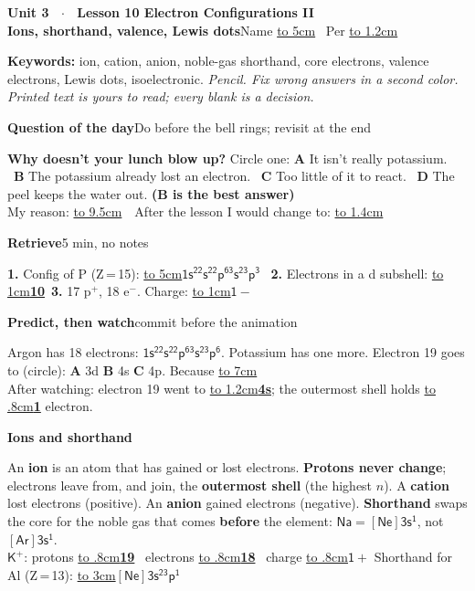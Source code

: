 \documentclass[12pt,letterpaper]{article}
\newif\ifkey \ifdefined\KEY\keytrue\fi
\newcommand{\cf}[1]{\ensuremath{\mathsf{#1}}}
\newcommand{\A}[1]{\ifkey\textcolor{key}{\textbf{#1}}\fi}
\newcommand{\bl}[2]{\underline{\hbox to #1{\hfil\A{#2}\hfil}}}
\newcommand{\sbar}[2][]{\vspace{3pt}\colorbox{gray!22}{\parbox{\dimexpr\linewidth-2\fboxsep}{\small\textbf{#2}\hfill{\footnotesize #1}}}\par\vspace{1pt}}
\newcommand{\dash}{\begin{tcolorbox}[enhanced,colback=white,colframe=black,boxrule=0.6pt,left=4pt,right=4pt,top=2pt,bottom=2pt,arc=0pt,borderline={0.6pt}{0pt}{white,dash pattern=on 4pt off 3pt}]}
\newcommand{\edash}{\end{tcolorbox}}
\begin{document}
\raggedright
\colorbox{gray!30}{\parbox{\dimexpr\linewidth-2\fboxsep}{\Large\textbf{Unit 3 \ $\cdot$ \ Lesson 10 \quad Electron Configurations II}\\[1pt]\normalsize\textbf{Ions, shorthand, valence, Lewis dots}\hfill Name \bl{5cm}{} \ Per \bl{1.2cm}{}}}\par
{\footnotesize\textbf{Keywords:} ion, cation, anion, noble-gas shorthand, core electrons, valence electrons, Lewis dots, isoelectronic. \hfill\textit{Pencil. Fix wrong answers in a second color. Printed text is yours to read; every blank is a decision.}}\par

\sbar[Do before the bell rings; revisit at the end]{Question of the day}
\dash\small\textbf{Why doesn't your lunch blow up?} Circle one: \textbf{A} It isn't really potassium. \ \textbf{B} The potassium already lost an electron. \ \textbf{C} Too little of it to react. \ \textbf{D} The peel keeps the water out. \A{(B is the best answer)}\\[2pt]
My reason: \bl{9.5cm}{}\ \ After the lesson I would change to: \bl{1.4cm}{}\edash

\sbar[5 min, no notes]{Retrieve}
\small\textbf{1.} Config of P (Z\,=\,15): \bl{5cm}{\cf{1s^22s^22p^63s^23p^3}} \ \textbf{2.} Electrons in a d subshell: \bl{1cm}{10}\ \textbf{3.} 17 p$^+$, 18 e$^-$. Charge: \bl{1cm}{\cf{1-}}

\sbar[commit before the animation]{Predict, then watch}
\small Argon has 18 electrons: \cf{1s^22s^22p^63s^23p^6}. Potassium has one more. Electron 19 goes to (circle): \textbf{A} 3d \quad \textbf{B} 4s \quad \textbf{C} 4p. Because \bl{7cm}{}\\
After watching: electron 19 went to \bl{1.2cm}{4s}; the outermost shell holds \bl{.8cm}{1} electron.

\sbar{Ions and shorthand}
\small An \textbf{ion} is an atom that has gained or lost electrons. \textbf{Protons never change}; electrons leave from, and join, the \textbf{outermost shell} (the highest $n$). A \textbf{cation} lost electrons (positive). An \textbf{anion} gained electrons (negative).
\textbf{Shorthand} swaps the core for the noble gas that comes \textbf{before} the element: \cf{Na = [Ne]3s^1}, not \cf{[Ar]3s^1}.\\[2pt]
\cf{K^+}: protons \bl{.8cm}{19} \ electrons \bl{.8cm}{18} \ charge \bl{.8cm}{\cf{1+}} \hfill Shorthand for Al (Z\,=\,13): \bl{3cm}{\cf{[Ne]3s^23p^1}}
\end{document}
